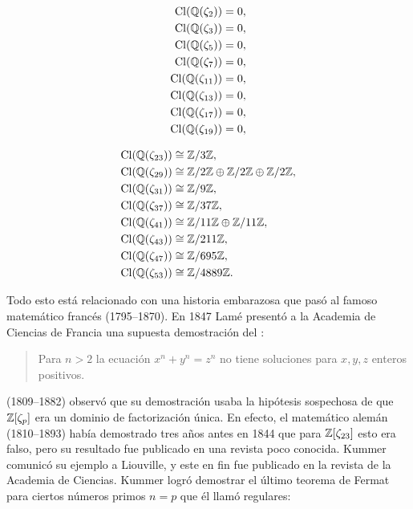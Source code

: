 \documentclass{article}
\numberwithin{equation}{section}
\theoremstyle{definition}
\begin{document}
\begin{minipage}[t]{0.5\textwidth}
  \begin{align*}
    \operatorname{Cl} (\mathbb{Q} (\zeta_2)) & = 0,\\
    \operatorname{Cl} (\mathbb{Q} (\zeta_3)) & = 0,\\
    \operatorname{Cl} (\mathbb{Q} (\zeta_5)) & = 0,\\
    \operatorname{Cl} (\mathbb{Q} (\zeta_7)) & = 0,\\
    \operatorname{Cl} (\mathbb{Q} (\zeta_{11})) & = 0,\\
    \operatorname{Cl} (\mathbb{Q} (\zeta_{13})) & = 0,\\
    \operatorname{Cl} (\mathbb{Q} (\zeta_{17})) & = 0,\\
    \operatorname{Cl} (\mathbb{Q} (\zeta_{19})) & = 0,
  \end{align*}
\end{minipage}
\begin{minipage}[t]{0.5\textwidth}
  \begin{align*}
    \operatorname{Cl} (\mathbb{Q} (\zeta_{23})) & \cong \mathbb{Z}/3\mathbb{Z}, \\
    \operatorname{Cl} (\mathbb{Q} (\zeta_{29})) & \cong \mathbb{Z}/2\mathbb{Z} \oplus \mathbb{Z}/2\mathbb{Z} \oplus \mathbb{Z}/2\mathbb{Z}, \\
    \operatorname{Cl} (\mathbb{Q} (\zeta_{31})) & \cong \mathbb{Z}/9\mathbb{Z}, \\
    \operatorname{Cl} (\mathbb{Q} (\zeta_{37})) & \cong \mathbb{Z}/37\mathbb{Z}, \\
    \operatorname{Cl} (\mathbb{Q} (\zeta_{41})) & \cong \mathbb{Z}/11\mathbb{Z} \oplus \mathbb{Z}/11\mathbb{Z}, \\
    \operatorname{Cl} (\mathbb{Q} (\zeta_{43})) & \cong \mathbb{Z}/211\mathbb{Z}, \\
    \operatorname{Cl} (\mathbb{Q} (\zeta_{47})) & \cong \mathbb{Z}/695\mathbb{Z}, \\
    \operatorname{Cl} (\mathbb{Q} (\zeta_{53})) & \cong \mathbb{Z}/4889\mathbb{Z}.
  \end{align*}
\end{minipage}

\vspace{1em}

Todo esto está relacionado con una historia embarazosa que pasó al famoso
matemático francés  (1795--1870). En 1847 Lamé
presentó a la Academia de Ciencias de Francia una supuesta demostración
del  \cite{Lame-1847}:

\begin{quote}
  \noindent Para $n > 2$ la ecuación $x^n + y^n = z^n$ no tiene soluciones para
  $x,y,z$ enteros positivos.
\end{quote}

\noindent {} (1809--1882) observó que su
demostración usaba la hipótesis sospechosa de que $\mathbb{Z} [\zeta_p]$ era un dominio
de factorización única. En efecto, el matemático alemán
 (1810--1893) había demostrado tres años antes en 1844
que para $\mathbb{Z} [\zeta_{23}]$ esto era falso, pero su resultado fue publicado en
una revista poco conocida. Kummer comunicó su ejemplo a Liouville, y este en fin
fue publicado en la revista de la Academia de Ciencias. Kummer logró demostrar
el último teorema de Fermat para ciertos números primos $n = p$ que él llamó
regulares:
\end{document}
